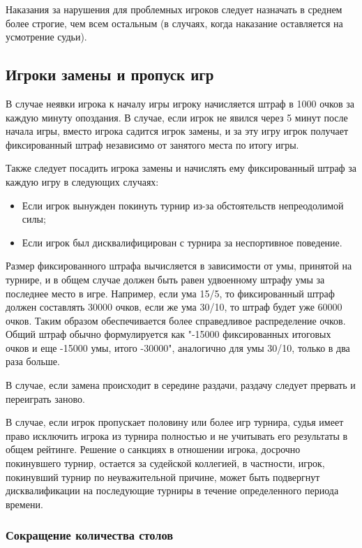 Наказания за нарушения для проблемных игроков следует назначать в среднем более строгие, чем всем остальным (в случаях, когда наказание оставляется на усмотрение судьи).

\subsection{Игроки замены и пропуск игр}

В случае неявки игрока к началу игры игроку начисляется штраф в 1000 очков за каждую минуту опоздания. В случае, если игрок не явился через 5 минут после начала игры, вместо игрока садится игрок замены, и за эту игру игрок получает фиксированный штраф независимо от занятого места по итогу игры.

Также следует посадить игрока замены и начислять ему фиксированный штраф за каждую игру в следующих случаях:
\begin{itemize}
	\item Если игрок вынужден покинуть турнир из-за обстоятельств непреодолимой силы;
	\item Если игрок был дисквалифицирован с турнира за неспортивное поведение.
\end{itemize}

Размер фиксированного штрафа вычисляется в зависимости от умы, принятой на турнире, и в общем случае должен быть равен удвоенному штрафу умы за последнее место в игре. Например, если ума 15/5, то фиксированный штраф должен составлять 30000 очков, если же ума 30/10, то штраф будет уже 60000 очков. Таким образом обеспечивается более справедливое распределение очков. Общий штраф обычно формулируется как "-15000 фиксированных итоговых очков и еще -15000 умы, итого -30000", аналогично для умы 30/10, только в два раза больше.

В случае, если замена происходит в середине раздачи, раздачу следует прервать и переиграть заново.

В случае, если игрок пропускает половину или более игр турнира, судья имеет право исключить игрока из турнира полностью и не учитывать его результаты в общем рейтинге. Решение о санкциях в отношении игрока, досрочно покинувшего турнир, остается за судейской коллегией, в частности, игрок, покинувший турнир по неуважительной причине, может быть подвергнут дисквалификации на последующие турниры в течение определенного периода времени.

\subsubsection{Сокращение количества столов}

